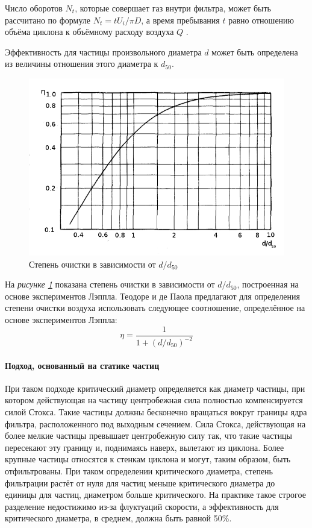 	Число оборотов $N_t$, которые совершает газ внутри фильтра, может быть рассчитано по формуле $N_t = tU_i/\pi D$, а время пребывания $t$ равно отношению объёма циклона к объёмному расходу воздуха $Q$ \cite{Kuo}.
	
	Эффективность для частицы произвольного диаметра $d$ может быть определена из величины отношения этого диаметра к $d_{50}$.
	\begin{figure}[ht]
		\centering
		\includegraphics[scale=0.5]{Lapple}
		\caption{Степень очистки в зависимости от $d/d_{50}$}
		\label{fig:lapple}
	\end{figure}
	На \textit{рисунке \ref{fig:lapple}} показана степень очистки в зависимости от $d/d_{50}$, построенная на основе экспериментов Лэппла. Теодоре и де Паола \cite{Theodore} предлагают для определения степени очистки воздуха использовать следующее соотношение, определённое на основе экспериментов Лэппла:
			\begin{equation}
				\eta = \frac{1}{1 + (d/d_{50})^{-2}}
			\end{equation}
			\paragraph{Подход, основанный на статике частиц\\}
			При таком подходе критический диаметр определяется как диаметр частицы, при котором действующая на частицу центробежная сила полностью компенсируется силой Стокса. Такие частицы должны бесконечно вращаться вокруг границы ядра фильтра, расположенного под выходным сечением. Сила Стокса, действующая на более мелкие частицы превышает центробежную силу так, что такие частицы пересекают эту границу и, поднимаясь наверх, вылетают из циклона. Более крупные частицы относятся к стенкам циклона и могут, таким образом, быть отфильтрованы. При таком определении критического диаметра, степень фильтрации растёт от нуля для частиц меньше критического диаметра до единицы для частиц, диаметром больше критического. На практике такое строгое разделение недостижимо из-за флуктуаций скорости, а эффективность для критического диаметра, в среднем, должна быть равной 50\%.
			
